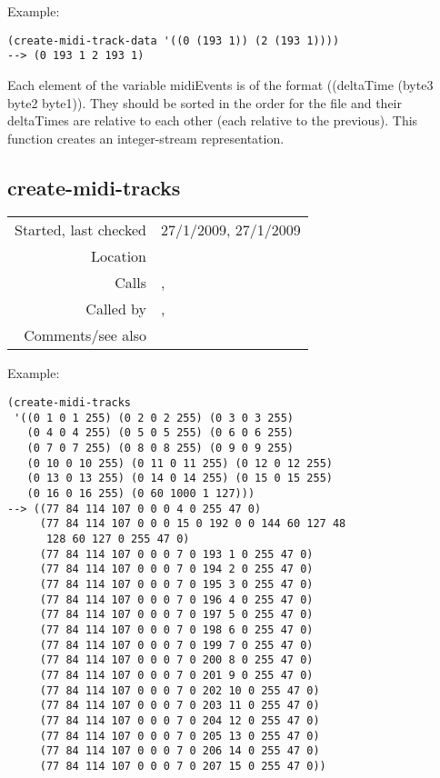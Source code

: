 \vspace{0.5cm}
\noindent Example:
\begin{verbatim}
(create-midi-track-data '((0 (193 1)) (2 (193 1))))
--> (0 193 1 2 193 1)
\end{verbatim}

\noindent Each element of the variable midiEvents is
of the format
((deltaTime (byte3 byte2 byte1)).
They should be sorted in the order for the file and
their deltaTimes are relative to each other (each
relative to the previous). This function creates an
integer-stream representation.


\subsection*{create-midi-tracks}\label{fun:create-midi-tracks}

\vspace{0.3cm}
\begin{tabular}{r|p{8cm}}
Started, last checked & 27/1/2009, 27/1/2009 \\
Location & \nameref{sec:MIDI-export} \\
Calls & \nameref{fun:create-tempo-track}, \nameref{fun:create-MTrk} \\
Called by & \nameref{fun:save-as-midi}, \nameref{fun:saveit} \\
Comments/see also &
\end{tabular}

\vspace{0.5cm}
\noindent Example:
\begin{verbatim}
(create-midi-tracks
 '((0 1 0 1 255) (0 2 0 2 255) (0 3 0 3 255)
   (0 4 0 4 255) (0 5 0 5 255) (0 6 0 6 255) 
   (0 7 0 7 255) (0 8 0 8 255) (0 9 0 9 255)
   (0 10 0 10 255) (0 11 0 11 255) (0 12 0 12 255)
   (0 13 0 13 255) (0 14 0 14 255) (0 15 0 15 255)
   (0 16 0 16 255) (0 60 1000 1 127)))
--> ((77 84 114 107 0 0 0 4 0 255 47 0)
     (77 84 114 107 0 0 0 15 0 192 0 0 144 60 127 48
      128 60 127 0 255 47 0)
     (77 84 114 107 0 0 0 7 0 193 1 0 255 47 0)
     (77 84 114 107 0 0 0 7 0 194 2 0 255 47 0)
     (77 84 114 107 0 0 0 7 0 195 3 0 255 47 0)
     (77 84 114 107 0 0 0 7 0 196 4 0 255 47 0)
     (77 84 114 107 0 0 0 7 0 197 5 0 255 47 0)
     (77 84 114 107 0 0 0 7 0 198 6 0 255 47 0)
     (77 84 114 107 0 0 0 7 0 199 7 0 255 47 0)
     (77 84 114 107 0 0 0 7 0 200 8 0 255 47 0)
     (77 84 114 107 0 0 0 7 0 201 9 0 255 47 0)
     (77 84 114 107 0 0 0 7 0 202 10 0 255 47 0)
     (77 84 114 107 0 0 0 7 0 203 11 0 255 47 0)
     (77 84 114 107 0 0 0 7 0 204 12 0 255 47 0)
     (77 84 114 107 0 0 0 7 0 205 13 0 255 47 0)
     (77 84 114 107 0 0 0 7 0 206 14 0 255 47 0)
     (77 84 114 107 0 0 0 7 0 207 15 0 255 47 0))
\end{verbatim}


